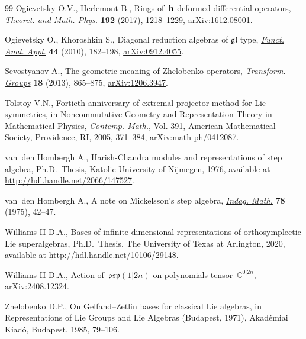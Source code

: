 \documentclass[pdftex]{sigma}
\numberwithin{equation}{section}
\begin{document}
\begin{thebibliography}{99}
Ogievetsky O.V., Herlemont B., Rings of~{$\bf h$}-deformed differential
 operators, \href{https://doi.org/10.1134/S0040577917080104}{\textit{Theoret. and Math. Phys.}} \textbf{192} (2017), 1218--1229,
 \href{https://arxiv.org/abs/1612.08001}{arXiv:1612.08001}.

 Ogievetsky O., Khoroshkin S., Diagonal reduction algebras of $\mathfrak{gl}$
 type, \href{https://doi.org/10.1007/s10688-010-0023-0}{\textit{Funct. Anal. Appl.}} \textbf{44} (2010), 182--198,
 \href{https://arxiv.org/abs/0912.4055}{arXiv:0912.4055}.

Sevostyanov A., The geometric meaning of {Z}helobenko operators,
 \href{https://doi.org/10.1007/s00031-013-9234-9}{\textit{Transform. Groups}} \textbf{18} (2013), 865--875, \href{https://arxiv.org/abs/1206.3947}{arXiv:1206.3947}.

Tolstoy V.N., Fortieth anniversary of extremal projector method for {L}ie
 symmetries, in Noncommutative {G}eometry and {R}epresentation {T}heory in
 {M}athematical {P}hysics, \textit{Contemp. Math.}, Vol. 391, \href{https://doi.org/10.1090/conm/391/07342}{American
 Mathematical Society, Providence}, RI, 2005, 371--384,
 \href{https://arxiv.org/abs/math-ph/0412087}{arXiv:math-ph/0412087}.

van~den Hombergh A., Harish-Chandra modules and representations of step
 algebra, Ph.D.~Thesis, {K}atolic University of {N}ijmegen, 1976, available at
 \url{http://hdl.handle.net/2066/147527}.

van~den Hombergh A., A note on {M}ickelsson's step algebra, \href{https://doi.org/10.1016/1385-7258(75)90013-X}{\textit{Indag.
 Math.}} \textbf{78} (1975), 42--47.

Williams II D.A., Bases of infinite-dimensional representations of
 orthosymplectic {L}ie superalgebras, Ph.D.~Thesis, {T}he University of
 {T}exas at {A}rlington, 2020, available at
 \url{http://hdl.handle.net/10106/29148}.

Williams II D.A., Action of~$\mathfrak{osp}(1|2n)$ on polynomials
 tensor~$\mathbb{C}^{0|2n}$, \href{https://arxiv.org/abs/2408.12324}{arXiv:2408.12324}.

Zhelobenko D.P., On {G}elfand--{Z}etlin bases for classical {L}ie algebras, in
 Representations of {L}ie {G}roups and {L}ie {A}lgebras ({B}udapest, 1971),
 Akad\'emiai Kiad\'o, Budapest, 1985, 79--106.


\end{thebibliography}
\end{document}
